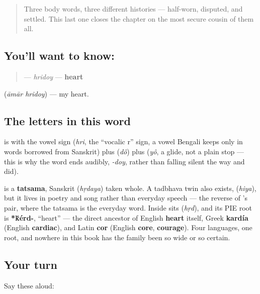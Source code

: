 \label{lesson:BN-C12-hridoy}



\begin{quote}
Three body words, three different histories — half-worn, disputed, and settled. This last one closes the chapter on the most secure cousin of them all.
\end{quote}

\subsection*{You'll want to know: }
\begin{quote}
\textbf{} — \emph{hridoy} — \textbf{heart}
\end{quote}

\textbf{ } (\emph{āmār hridoy}) — my heart.

\subsection*{The letters in this word}
\textbf{} is \textbf{} with the vowel sign \textbf{} (\emph{hri}, the \textquotedblleft{}vocalic r\textquotedblright{} sign, a vowel Bengali keeps only in words borrowed from Sanskrit) plus \textbf{} (\emph{dô}) plus \textbf{} (\emph{yô}, a glide, not a plain stop — this is why the word ends audibly, \emph{-doy}, rather than falling silent the way  and  did).

\begin{cousinweb}
\textbf{} is a \textbf{tatsama}, Sanskrit \textbf{} (\emph{hṛdaya}) taken whole. A tadbhava twin also exists, \textbf{} (\emph{hiya}), but it lives in poetry and song rather than everyday speech — the reverse of 's pair, where the tatsama is the everyday word. Inside  sits \textbf{} (\emph{hṛd}), and its PIE root is \textbf{*\'{k}érd-}, \textquotedblleft{}heart\textquotedblright{} — the direct ancestor of English \textbf{heart} itself, Greek \textbf{kardía} (English \textbf{cardiac}), and Latin \textbf{cor} (English \textbf{core}, \textbf{courage}). Four languages, one root, and nowhere in this book has the family been so wide or so certain.
\end{cousinweb}

\subsection*{Your turn}
Say these aloud:

